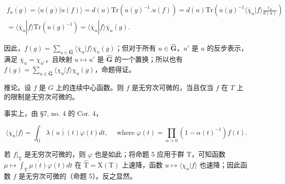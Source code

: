 \[
\begin{array}{c} f _ {u} (g) = \langle u (g) | u (f) \rangle = d (u) \mathrm{Tr} (u (g) ^ {- 1}. u (f)) = d (u) \mathrm{Tr} \left(u (g) ^ {- 1} \langle \overline {{\chi}} _ {u} | f \rangle \frac {\varepsilon_ {u}}{d (u)}\right) \\ = \langle \overline {{\chi}} _ {u} | f \rangle \mathrm{Tr} (u (g) ^ {- 1}) = \langle \overline {{\chi}} _ {u} | f \rangle \overline {{\chi}} _ {u} (g). \end{array}
\]

因此，\(f(g) = \sum_{u\in \hat{\mathbf{G}}}\langle \overline{\chi}_u|f\rangle \overline{\chi}_u(g)\)；但对于所有 \(u\in \hat{\mathbf{G}}\)，\(u'\) 是 \(u\) 的反步表示，满足 \(\overline{\chi}_u = \chi_{u'}\)，且映射 \(u\mapsto u'\) 是 \(\hat{\mathbf{G}}\) 的一个置换；所以也有 \(f(g) = \sum_{u\in \hat{\mathbf{G}}}\langle \chi_u|f\rangle \chi_u(g)\)，命题得证。

推论。设 \(f\) 是 \(G\) 上的连续中心函数。则 \(f\) 是无穷次可微的，当且仅当 \(f\) 在 \(T\) 上的限制是无穷次可微的。

事实上，由 §7, no. 4 的 Cor. 4，

\[
\langle \chi_ {u} | f \rangle = \int_ {\mathrm{G}} \overline {{\lambda (u) (t)}} \varphi (t) d t, \quad \text { where } \varphi (t) = \prod_ {\alpha > 0} (1 - \alpha (t) ^ {- 1}) f (t).
\]

若 \(f|_{\mathrm{T}}\) 是无穷次可微的，则 \(\varphi\) 也是如此；将命题 5 应用于群 \(\mathrm{T}\)，可知函数 \(\mu \mapsto \int_{\mathrm{T}} \overline{\mu(t)} \varphi(t) dt\) 在 \(\hat{\mathrm{T}} = \mathrm{X}(\mathrm{T})\) 上速降，函数 \(u \mapsto \langle \chi_u | f \rangle\) 也速降；因此函数 \(f\) 是无穷次可微的（命题 5）。反之显然。

